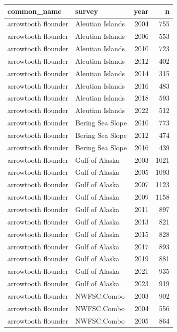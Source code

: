 \documentclass[
  letterpaper,
  DIV=11,
  numbers=noendperiod]{scrartcl}
\begin{document}
\begin{tabular}[t]{l|l|r|r}
\hline
common\_name & survey & year & n\\
\hline
arrowtooth flounder & Aleutian Islands & 2004 & 755\\
\hline
arrowtooth flounder & Aleutian Islands & 2006 & 553\\
\hline
arrowtooth flounder & Aleutian Islands & 2010 & 723\\
\hline
arrowtooth flounder & Aleutian Islands & 2012 & 402\\
\hline
arrowtooth flounder & Aleutian Islands & 2014 & 315\\
\hline
arrowtooth flounder & Aleutian Islands & 2016 & 483\\
\hline
arrowtooth flounder & Aleutian Islands & 2018 & 593\\
\hline
arrowtooth flounder & Aleutian Islands & 2022 & 512\\
\hline
arrowtooth flounder & Bering Sea Slope & 2010 & 773\\
\hline
arrowtooth flounder & Bering Sea Slope & 2012 & 474\\
\hline
arrowtooth flounder & Bering Sea Slope & 2016 & 439\\
\hline
arrowtooth flounder & Gulf of Alaska & 2003 & 1021\\
\hline
arrowtooth flounder & Gulf of Alaska & 2005 & 1093\\
\hline
arrowtooth flounder & Gulf of Alaska & 2007 & 1123\\
\hline
arrowtooth flounder & Gulf of Alaska & 2009 & 1158\\
\hline
arrowtooth flounder & Gulf of Alaska & 2011 & 897\\
\hline
arrowtooth flounder & Gulf of Alaska & 2013 & 821\\
\hline
arrowtooth flounder & Gulf of Alaska & 2015 & 828\\
\hline
arrowtooth flounder & Gulf of Alaska & 2017 & 893\\
\hline
arrowtooth flounder & Gulf of Alaska & 2019 & 881\\
\hline
arrowtooth flounder & Gulf of Alaska & 2021 & 935\\
\hline
arrowtooth flounder & Gulf of Alaska & 2023 & 919\\
\hline
arrowtooth flounder & NWFSC.Combo & 2003 & 902\\
\hline
arrowtooth flounder & NWFSC.Combo & 2004 & 556\\
\hline
arrowtooth flounder & NWFSC.Combo & 2005 & 864\\

\end{tabular}
\end{document}
